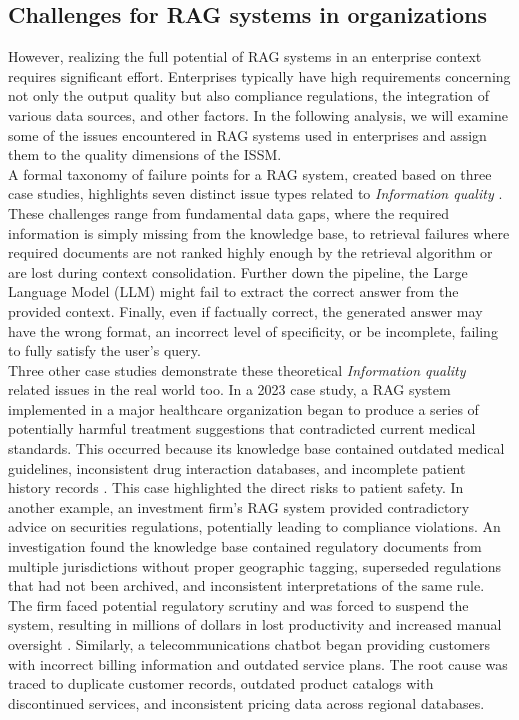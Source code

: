 \documentclass[
	english,
	ruledheaders=section,%
	class=report,%
	thesis={type=bachelor},%
	accentcolor=1b,%
	custommargins=true,%
	marginpar=false,%
	parskip=half-,%
	fontsize=11pt,%
	DIV=14,
]{tudapub}
\begin{document}
\subsection{Challenges for RAG systems in organizations}
However, realizing the full potential of RAG systems in an enterprise context requires significant effort. Enterprises typically have high requirements concerning not only the output quality but also compliance regulations, the integration of various data sources, and other factors. In the following analysis, we will examine some of the issues encountered in RAG systems used in enterprises and assign them to the quality dimensions of the ISSM. \\
A formal taxonomy of failure points for a RAG system, created based on three case studies, highlights seven distinct issue types related to \textit{Information quality} \parencite[p.~91]{Barnett2024}. These challenges range from fundamental data gaps, where the required information is simply missing from the knowledge base, to retrieval failures where required documents are not ranked highly enough by the retrieval algorithm or are lost during context consolidation. Further down the pipeline, the Large Language Model (LLM) might fail to extract the correct answer from the provided context. Finally, even if factually correct, the generated answer may have the wrong format, an incorrect level of specificity, or be incomplete, failing to fully satisfy the user's query.\\
Three other case studies demonstrate these theoretical \textit{Information quality} related issues in the real world too. In a 2023 case study, a RAG system implemented in a major healthcare organization began to produce a series of potentially harmful treatment suggestions that contradicted current medical standards. This occurred because its knowledge base contained outdated medical guidelines, inconsistent drug interaction databases, and incomplete patient history records \parencite{NStarX_Inc_2025}. This case highlighted the direct risks to patient safety. In another example, an investment firm's RAG system provided contradictory advice on securities regulations, potentially leading to compliance violations. An investigation found the knowledge base contained regulatory documents from multiple jurisdictions without proper geographic tagging, superseded regulations that had not been archived, and inconsistent interpretations of the same rule. The firm faced potential regulatory scrutiny and was forced to suspend the system, resulting in millions of dollars in lost productivity and increased manual oversight \parencite{NStarX_Inc_2025}. Similarly, a telecommunications chatbot began providing customers with incorrect billing information and outdated service plans. The root cause was traced to duplicate customer records, outdated product catalogs with discontinued services, and inconsistent pricing data across regional databases. \parencite{NStarX_Inc_2025}\\
\end{document}
